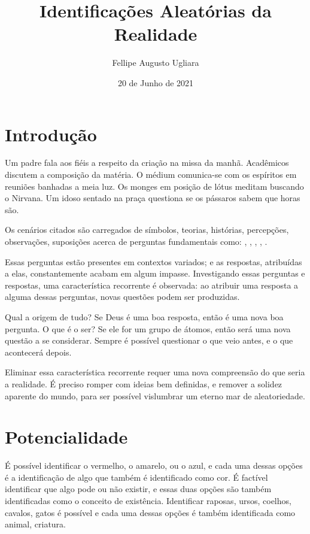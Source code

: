 \documentclass[11pt]{article}
\title{Identificações Aleatórias da Realidade}
\author{Fellipe Augusto Ugliara}
\date{20 de Junho de 2021}
\begin{document}
	\maketitle
	
	\section{Introdução} \label{pt-s1}
	
	Um padre fala aos fiéis a respeito da criação na missa da manhã. Acadêmicos discutem a composição da matéria. O médium comunica-se com os espíritos em reuniões banhadas a meia luz. Os monges em posição de lótus meditam buscando o Nirvana. Um idoso sentado na praça questiona se os pássaros sabem que horas são.
	
	Os cenários citados são carregados de símbolos, teorias, histórias, percepções, observações, suposições acerca de perguntas fundamentais como: , , , , .
	
	Essas perguntas estão presentes em contextos variados; e as respostas, atribuídas a elas, constantemente acabam em algum impasse. Investigando essas perguntas e respostas, uma característica recorrente é observada: ao atribuir uma resposta a alguma dessas perguntas, novas questões podem ser produzidas.
	
	Qual a origem de tudo? Se Deus é uma boa resposta, então  é uma nova boa pergunta. O que é o ser? Se ele for um grupo de átomos, então  será uma nova questão a se considerar. Sempre é possível questionar o que veio antes, e o que acontecerá depois.
	
	Eliminar essa característica recorrente requer uma nova compreensão do que seria a realidade. É preciso romper com ideias bem definidas, e remover a solidez aparente do mundo, para ser possível vislumbrar um eterno mar de aleatoriedade. 
	
	\section{Potencialidade} \label{pt-s2}
	
	É possível identificar o vermelho, o amarelo, ou o azul, e cada uma dessas opções é a identificação de algo que também é identificado como cor. É factível identificar que algo pode ou não existir, e essas duas opções são também identificadas como o conceito de existência. Identificar raposas, ursos, coelhos, cavalos, gatos é possível e cada uma dessas opções é também identificada como animal, criatura.
		
\end{document}
